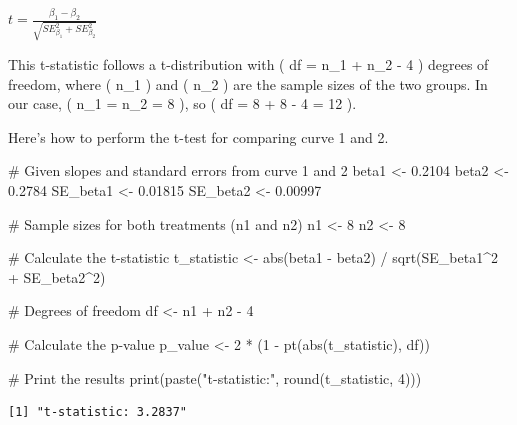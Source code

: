 \documentclass[
  letterpaper,
]{book}
\newenvironment{Shaded}{\begin{snugshade}}{\end{snugshade}}
\newcommand{\CommentTok}[1]{\textcolor[rgb]{0.37,0.37,0.37}{#1}}
\newcommand{\DecValTok}[1]{\textcolor[rgb]{0.68,0.00,0.00}{#1}}
\newcommand{\FloatTok}[1]{\textcolor[rgb]{0.68,0.00,0.00}{#1}}
\newcommand{\FunctionTok}[1]{\textcolor[rgb]{0.28,0.35,0.67}{#1}}
\newcommand{\NormalTok}[1]{\textcolor[rgb]{0.00,0.23,0.31}{#1}}
\newcommand{\OtherTok}[1]{\textcolor[rgb]{0.00,0.23,0.31}{#1}}
\newcommand{\SpecialCharTok}[1]{\textcolor[rgb]{0.37,0.37,0.37}{#1}}
\newcommand{\StringTok}[1]{\textcolor[rgb]{0.13,0.47,0.30}{#1}}
\begin{document}
\(t = \frac{\beta_1 - \beta_2}{\sqrt{SE_{\beta_1}^2 + SE_{\beta_2}^2}}\)

This t-statistic follows a t-distribution with ( df = n\_1 + n\_2 - 4 )
degrees of freedom, where ( n\_1 ) and ( n\_2 ) are the sample sizes of
the two groups. In our case, ( n\_1 = n\_2 = 8 ), so ( df = 8 + 8 - 4 =
12 ).

Here's how to perform the t-test for comparing curve 1 and 2.

\begin{Shaded}
\begin{Highlighting}[]
\CommentTok{\# Given slopes and standard errors from curve 1 and 2}
\NormalTok{beta1 }\OtherTok{\textless{}{-}} \FloatTok{0.2104} 
\NormalTok{beta2 }\OtherTok{\textless{}{-}} \FloatTok{0.2784} 
\NormalTok{SE\_beta1 }\OtherTok{\textless{}{-}} \FloatTok{0.01815} 
\NormalTok{SE\_beta2 }\OtherTok{\textless{}{-}} \FloatTok{0.00997}

\CommentTok{\# Sample sizes for both treatments (n1 and n2)}
\NormalTok{n1 }\OtherTok{\textless{}{-}} \DecValTok{8}
\NormalTok{n2 }\OtherTok{\textless{}{-}} \DecValTok{8}

\CommentTok{\# Calculate the t{-}statistic}
\NormalTok{t\_statistic }\OtherTok{\textless{}{-}} \FunctionTok{abs}\NormalTok{(beta1 }\SpecialCharTok{{-}}\NormalTok{ beta2) }\SpecialCharTok{/} \FunctionTok{sqrt}\NormalTok{(SE\_beta1}\SpecialCharTok{\^{}}\DecValTok{2} \SpecialCharTok{+}\NormalTok{ SE\_beta2}\SpecialCharTok{\^{}}\DecValTok{2}\NormalTok{)}

\CommentTok{\# Degrees of freedom}
\NormalTok{df }\OtherTok{\textless{}{-}}\NormalTok{ n1 }\SpecialCharTok{+}\NormalTok{ n2 }\SpecialCharTok{{-}} \DecValTok{4}

\CommentTok{\# Calculate the p{-}value}
\NormalTok{p\_value }\OtherTok{\textless{}{-}} \DecValTok{2} \SpecialCharTok{*}\NormalTok{ (}\DecValTok{1} \SpecialCharTok{{-}} \FunctionTok{pt}\NormalTok{(}\FunctionTok{abs}\NormalTok{(t\_statistic), df))}

\CommentTok{\# Print the results}
\FunctionTok{print}\NormalTok{(}\FunctionTok{paste}\NormalTok{(}\StringTok{"t{-}statistic:"}\NormalTok{, }\FunctionTok{round}\NormalTok{(t\_statistic, }\DecValTok{4}\NormalTok{)))}
\end{Highlighting}
\end{Shaded}

\begin{verbatim}
[1] "t-statistic: 3.2837"
\end{verbatim}
\end{document}
